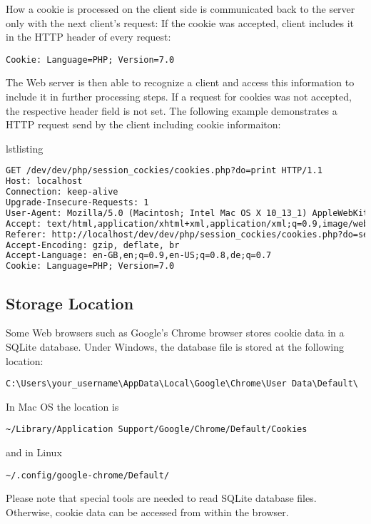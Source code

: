 \documentclass[a4paper, justified, notoc]{tufte-handout} %
\makeatletter
\newenvironment{listing}[1][htbp]
  {\ifvmode\else\unskip\fi\begin{@tufte@float}[#1]{lstlisting}{}}
  {\end{@tufte@float} } %
\makeatother
\begin{document}
How a cookie is processed on the client side is communicated back to the server only with the next client's request: If the cookie was accepted, client includes it in the HTTP header of every request:
\begin{Verbatim}
Cookie: Language=PHP; Version=7.0
\end{Verbatim}
The Web server is then able to recognize a client and access this information to include it in further processing steps.
If a request for cookies was not accepted, the respective header field is not set.
The following example demonstrates a HTTP request send by the client including cookie informaiton:
\begin{listing}
\begin{lstlisting}[language=HTML]
GET /dev/dev/php/session_cockies/cookies.php?do=print HTTP/1.1
Host: localhost
Connection: keep-alive
Upgrade-Insecure-Requests: 1
User-Agent: Mozilla/5.0 (Macintosh; Intel Mac OS X 10_13_1) AppleWebKit/537.36 (KHTML, like Gecko) Chrome/63.0.3239.84 Safari/537.36
Accept: text/html,application/xhtml+xml,application/xml;q=0.9,image/webp,image/apng,*/*;q=0.8
Referer: http://localhost/dev/dev/php/session_cockies/cookies.php?do=set
Accept-Encoding: gzip, deflate, br
Accept-Language: en-GB,en;q=0.9,en-US;q=0.8,de;q=0.7
Cookie: Language=PHP; Version=7.0
\end{lstlisting}
	\caption{A client's HTTP request with cookie data included}
	\label{setting_cookies}
\end{listing}


\subsection{Storage Location} %
\label{sub:storage_location}
Some Web browsers such as Google's Chrome browser stores cookie data in a SQLite database. 
Under Windows, the database file is stored at the following location:
\begin{Verbatim}
C:\Users\your_username\AppData\Local\Google\Chrome\User Data\Default\
\end{Verbatim}
In Mac OS the location is
\begin{Verbatim}
~/Library/Application Support/Google/Chrome/Default/Cookies
\end{Verbatim}
and in Linux
\begin{Verbatim}
~/.config/google-chrome/Default/
\end{Verbatim}
Please note that special tools are needed to read SQLite database files. Otherwise, cookie data can be accessed from within the browser.
\end{document}
